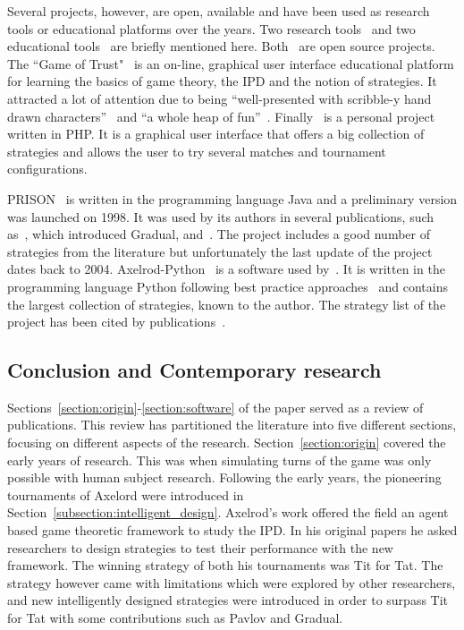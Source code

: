 \documentclass{article}
\theoremstyle{definition}
\begin{document}
Several projects, however, are open, available and have been used as research
tools or educational platforms over the years. Two research tools~\cite{prison,
axelrodproject} and two educational tools~\cite{pd_trust, pd_game} are briefly
mentioned here. Both~\cite{prison, axelrodproject} are open
source projects.
The ``Game of Trust"~\cite{pd_trust} is an on-line, graphical user interface
educational platform for learning the basics of game theory, the IPD
and the notion of strategies. It attracted a lot of attention
due to being ``well-presented with scribble-y hand drawn
characters''~\cite{trust_blogb} and ``a whole heap of fun''~\cite{trust_bloga}.
Finally~\cite{pd_game} is a personal project written in PHP. It is a graphical user
interface that offers a big collection of strategies and allows the user to try
several matches and tournament configurations.

PRISON~\cite{prison} is written in the programming
language Java and a preliminary version was launched on 1998. It was used by its
authors in several publications, such as~\cite{Beaufils1997}, which introduced
Gradual, and~\cite{Beaufils1988}. The project includes a good number of
strategies from the literature but unfortunately the last update of the project
dates back to 2004. Axelrod-Python~\cite{axelrodproject} is a software used
by~\cite{Knight2017,KnightHGC17, Goodman2018, Wang2017}. It is written in the
programming language Python following best practice approaches~\cite{Aberdour2007,
Benureau2018} and contains the
largest collection of strategies, known to the author. The strategy list of
the project has been cited by publications~\cite{Anastassacos2018, Hayes2017,
Neumann2018}.

\subsection{Conclusion and Contemporary research}\label{section:contemporary_period}

Sections~\ref{section:origin}-\ref{section:software} of the paper served as a review of publications.
This review has partitioned the literature into five different sections,
focusing on different aspects of the research. Section~\ref{section:origin}
covered the early years of research. This was when simulating turns of the game
was only possible with human subject research.
Following the early years, the pioneering tournaments of Axelord were introduced in
Section~\ref{subsection:intelligent_design}. Axelrod's work offered the field an
agent based game theoretic framework to study the IPD.
In his original papers he asked researchers to design strategies to test their
performance with the new framework. The winning strategy of both his tournaments
was Tit for Tat. The strategy however came with limitations which were explored
by other researchers, and new intelligently designed strategies were introduced in
order to surpass Tit for Tat with some contributions such as Pavlov and Gradual.
\end{document}
